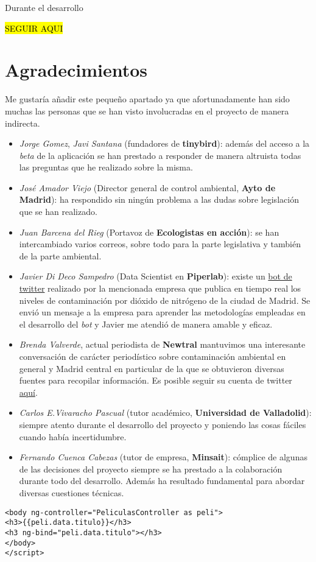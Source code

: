 Durante el desarrollo 

 \hl{SEGUIR AQUI}


\section{Agradecimientos}\label{reconocimientos}
Me gustaría añadir este pequeño apartado ya que afortunadamente han sido muchas las personas que se han visto involucradas en el proyecto de manera indirecta. 
\begin{itemize}
	\item \textit{Jorge Gomez}, \textit{Javi Santana} (fundadores de \textbf{tinybird}): además del acceso a la \textit{beta} de la aplicación se han prestado a responder de manera altruista todas las preguntas que he realizado sobre la misma.
	\item \textit{José Amador Viejo} (Director general de control ambiental, \textbf{Ayto de Madrid}): ha respondido sin ningún problema a las dudas sobre legislación que se han realizado.
	\item \textit{Juan Barcena del Rieg} (Portavoz de \textbf{Ecologistas en acción}): se han intercambiado varios correos, sobre todo para la parte legislativa y también de la parte ambiental.
	\item \textit{Javier Di Deco Sampedro} (Data Scientist en \textbf{Piperlab}): existe un \href{https://twitter.com/datoxnitro_bot}{bot de twitter} realizado por la mencionada empresa que publica en tiempo real los niveles de contaminación por dióxido de nitrógeno de la ciudad de Madrid. Se envió un mensaje a la empresa para aprender las metodologías empleadas en el desarrollo del \textit{bot} y Javier me atendió de manera amable y eficaz.
	\item \textit{Brenda Valverde}, actual periodista de \textbf{Newtral} mantuvimos una interesante conversación de carácter periodístico sobre contaminación ambiental en general y Madrid central en particular de la que se obtuvieron diversas fuentes para recopilar información. Es posible seguir su cuenta de twitter \href{https://twitter.com/brbrebren}{aquí}.
	\item \textit{Carlos E.Vivaracho Pascual} (tutor académico, \textbf{Universidad de Valladolid}): siempre atento durante el desarrollo del proyecto y poniendo las cosas fáciles cuando había incertidumbre.
    \item \textit{Fernando Cuenca Cabezas} (tutor de empresa, \textbf{Minsait}): cómplice de algunas de las decisiones del proyecto siempre se ha prestado a la colaboración durante todo del desarrollo. Además ha resultado fundamental para abordar diversas cuestiones técnicas.
\end{itemize}



\lstset{breaklines=true, basicstyle=\footnotesize}
\begin{lstlisting}[frame=single]
<body ng-controller="PeliculasController as peli">  
<h3>{{peli.data.titulo}}</h3>
<h3 ng-bind="peli.data.titulo"></h3>
</body>  
</script> 
\end{lstlisting}
